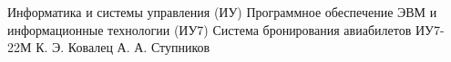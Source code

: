 \makecourseworktitle
{Информатика и системы управления (ИУ)}
{Программное обеспечение ЭВМ и информационные технологии (ИУ7)}
{Система бронирования авиабилетов}
{ИУ7-22М}
{К. Э. Ковалец}
{А. А. Ступников}
{}
{}
